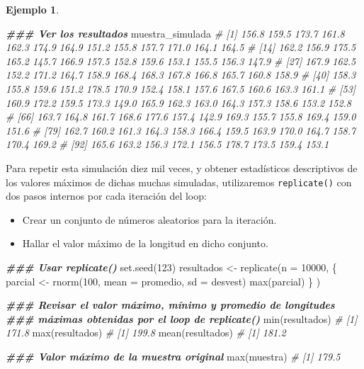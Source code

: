 \documentclass[
]{article}
\newenvironment{Shaded}{\begin{snugshade}}{\end{snugshade}}
\newcommand{\AttributeTok}[1]{\textcolor[rgb]{0.77,0.63,0.00}{#1}}
\newcommand{\CommentTok}[1]{\textcolor[rgb]{0.56,0.35,0.01}{\textit{#1}}}
\newcommand{\DecValTok}[1]{\textcolor[rgb]{0.00,0.00,0.81}{#1}}
\newcommand{\DocumentationTok}[1]{\textcolor[rgb]{0.56,0.35,0.01}{\textbf{\textit{#1}}}}
\newcommand{\FunctionTok}[1]{\textcolor[rgb]{0.00,0.00,0.00}{#1}}
\newcommand{\NormalTok}[1]{#1}
\newcommand{\OtherTok}[1]{\textcolor[rgb]{0.56,0.35,0.01}{#1}}
\providecommand{\tightlist}{%
  \setlength{\itemsep}{0pt}\setlength{\parskip}{0pt}}
\theoremstyle{definition}
\theoremstyle{definition}
\newtheorem{example}{Ejemplo}[section]
\theoremstyle{definition}
\theoremstyle{definition}
\theoremstyle{remark}
\begin{document}
\begin{example}
\begin{Shaded}
\begin{Highlighting}[]
\DocumentationTok{\#\#\# Ver los resultados}
\NormalTok{muestra\_simulada}
\CommentTok{\#   [1] 156.8 159.5 173.7 161.8 162.3 174.9 164.9 151.2 155.8 157.7 171.0 164.1 164.5}
\CommentTok{\#  [14] 162.2 156.9 175.5 165.2 145.7 166.9 157.5 152.8 159.6 153.1 155.5 156.3 147.9}
\CommentTok{\#  [27] 167.9 162.5 152.2 171.2 164.7 158.9 168.4 168.3 167.8 166.8 165.7 160.8 158.9}
\CommentTok{\#  [40] 158.3 155.8 159.6 151.2 178.5 170.9 152.4 158.1 157.6 167.5 160.6 163.3 161.1}
\CommentTok{\#  [53] 160.9 172.2 159.5 173.3 149.0 165.9 162.3 163.0 164.3 157.3 158.6 153.2 152.8}
\CommentTok{\#  [66] 163.7 164.8 161.7 168.6 177.6 157.4 142.9 169.3 155.7 155.8 169.4 159.0 151.6}
\CommentTok{\#  [79] 162.7 160.2 161.3 164.3 158.3 166.4 159.5 163.9 170.0 164.7 158.7 170.4 169.2}
\CommentTok{\#  [92] 165.6 163.2 156.3 172.1 156.5 178.7 173.5 159.4 153.1}
\end{Highlighting}
\end{Shaded}

Para repetir esta simulación diez mil veces, y obtener estadísticos descriptivos de los valores máximos de dichas muchas simuladas, utilizaremos \texttt{replicate()} con dos pasos internos por cada iteración del loop:

\begin{itemize}
\tightlist
\item
  Crear un conjunto de números aleatorios para la iteración.
\item
  Hallar el valor máximo de la longitud en dicho conjunto.
\end{itemize}

\begin{Shaded}
\begin{Highlighting}[]
\DocumentationTok{\#\#\# Usar replicate()}
\FunctionTok{set.seed}\NormalTok{(}\DecValTok{123}\NormalTok{)}
\NormalTok{resultados }\OtherTok{\textless{}{-}} \FunctionTok{replicate}\NormalTok{(}\AttributeTok{n =} \DecValTok{10000}\NormalTok{, \{}
\NormalTok{  parcial }\OtherTok{\textless{}{-}} \FunctionTok{rnorm}\NormalTok{(}\DecValTok{100}\NormalTok{, }\AttributeTok{mean =}\NormalTok{ promedio, }\AttributeTok{sd =}\NormalTok{ desvest)}
  \FunctionTok{max}\NormalTok{(parcial)}
\NormalTok{  \}}
\NormalTok{) }

\DocumentationTok{\#\#\# Revisar el valor máximo, mínimo y promedio de longitudes }
\DocumentationTok{\#\#\# máximas obtenidas por el loop de replicate()}
\FunctionTok{min}\NormalTok{(resultados)}
\CommentTok{\# [1] 171.8}
\FunctionTok{max}\NormalTok{(resultados)}
\CommentTok{\# [1] 199.8}
\FunctionTok{mean}\NormalTok{(resultados)}
\CommentTok{\# [1] 181.2}

\DocumentationTok{\#\#\# Valor máximo de la muestra original}
\FunctionTok{max}\NormalTok{(muestra)}
\CommentTok{\# [1] 179.5}
\end{Highlighting}
\end{Shaded}

\end{example}
\end{document}
